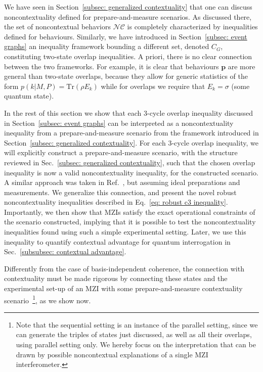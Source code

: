 \documentclass[a4paper,twocolumn,11pt,accepted=2024-01-17]{quantumarticle}
\begin{document}
{We have seen in Section~\ref{subsec: generalized contextuality} that one can discuss noncontextuality defined for prepare-and-measure scenarios. As discussed there, the set of noncontextual behaviors $\mathcal{NC}$ is completely characterized by inequalities defined for behaviours. Similarly, we have introduced in Section~\ref{subsec: event graphs} an inequality framework bounding a different set, denoted $C_G$, constituting two-state overlap inequalities. A priori, there is no clear connection between the two frameworks. %
For example, it is clear that behaviours $\mathbf{p}$ are more general than two-state overlaps, because they allow for generic statistics of the form $p(k|M,P) = \text{Tr}(\rho E_k)$ while for overlaps we require that $E_k = \sigma $ (some quantum state). }

{In the rest of this section we show that each $3$-cycle overlap inequality discussed in Section~\ref{subsec: event graphs} can be interpreted as a noncontextuality inequality from a prepare-and-measure scenario from the framework introduced in Section~\ref{subsec: generalized contextuality}. For each $3$-cycle overlap inequality, we will explicitly construct a prepare-and-measure scenario, with the structure reviewed in Sec.~\ref{subsec: generalized contextuality}, such that the chosen overlap inequality is now a valid noncontextuality inequality, for the constructed scenario. A similar approach was taken in Ref.~\cite{wagner2022inequalities}, but assuming ideal preparations and measurements. We generalize this connection, and present the  novel robust noncontextuality inequalities described in Eq.~\eqref{eq: robust c3 inequality}. Importantly, we then show that MZIs satisfy the exact operational constraints of the scenario constructed, implying that it is possible to test the noncontextuality inequalities found using such a simple experimental setting. Later, we use this inequality to quantify contextual advantage for quantum interrogation in Sec.~\ref{subsubsec: contextual advantage}. }

Differently from the case of basis-independent coherence, the connection with contextuality must be made rigorous by connecting these states and the experimental set-up of an MZI with some prepare-and-measure contextuality scenario~\footnote{Note that the sequential setting is an instance of  the parallel setting, since we can generate the triples of states just discussed, as well as all their overlaps, using parallel setting only. We hereby focus on the interpretation that can be drawn by possible noncontextual explanations of a single MZI interferometer.}, as we show now. 
\end{document}

